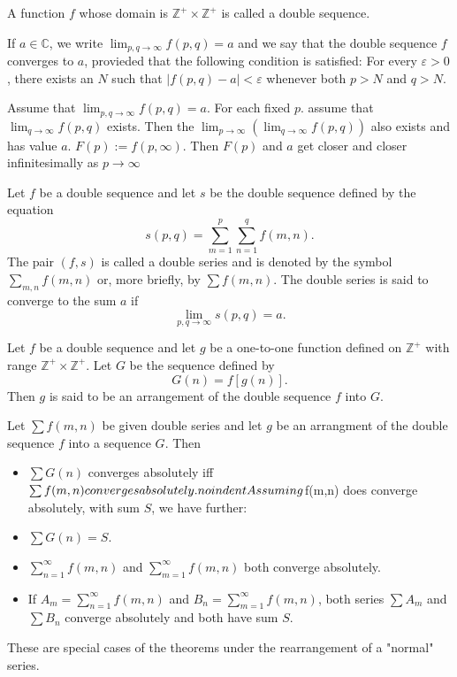 \documentclass[10pt,a4paper]{book}
\begin{document}
\begin{deff}
A function $f$ whose domain is $\mathbb{Z}^+ \times \mathbb{Z}^+$ is called a double sequence.
\end{deff}

\begin{deff}
If $a \in \mathbb{C}$, we write $\lim_{p,q \rightarrow \infty} f(p,q) = a$ and we say that the double sequence $f$ converges to $a$, provieded that the following condition is satisfied: For every $\varepsilon >0$, there exists an $N$ such that $|f(p,q)-a| < \varepsilon$ whenever both $p>N$ and $q > N$.

\end{deff}
\begin{Thm}
Assume that $\lim_{p,q \rightarrow \infty} f(p,q) = a.$ For each fixed $p$. assume that $\lim_{q \rightarrow \infty} f(p,q)$ exists. Then the $\lim_{p \rightarrow \infty}(\lim_{q \rightarrow \infty} f(p,q))$ also exists and has value $a$. $F(p) := f(p,\infty)$. Then $F(p)$ and $a$ get closer and closer infinitesimally as $p \rightarrow \infty$  
\end{Thm}

\begin{deff}
Let $f$ be a double sequence and let $s$ be the double sequence defined by the equation
$$s(p,q) = \sum_{m=1}^p \sum_{n=1}^q f(m,n).$$
The pair $(f,s)$ is called a double series and is denoted by the symbol $\sum_{m,n} f(m,n)$ or, more briefly, by $\sum f(m,n).$ The double series is said to converge to the sum $a$ if 
$$\lim_{p,q \rightarrow \infty} s(p,q) = a.$$
\end{deff}
\begin{deff}
Let $f$ be a double sequence and let $g$ be a one-to-one function defined on $\mathbb{Z}^+$ with range $\mathbb{Z}^+ \times \mathbb{Z}^+.$ Let $G$ be the sequence defined by 
$$G(n) = f[g(n)].$$
Then $g$ is said to be an arrangement of the double sequence $f$ into $G$.

\end{deff}
\begin{Thm}
Let $\sum f(m,n)$ be given double series and let $g$ be an arrangment of the double sequence $f$ into a sequence $G$. Then
\begin{itemize}
\item $\sum G(n) $ converges absolutely iff $\sum f(m,n) converges absolutely.\\
noindent Assuming $\sum f(m,n) does converge absolutely, with sum $S$, we have further:\\
\item $\sum G(n) = S$.
\item $\sum_{n=1}^\infty f(m,n)$ and $\sum_{m=1}^\infty f(m,n)$ both converge absolutely.
\item If $A_m = \sum_{n=1}^\infty f(m,n)$ and $B_n = \sum_{m=1}^\infty f(m,n)$, both series $\sum A_m$ and $\sum B_n$ converge absolutely and both have sum $S$.\end{itemize}

\end{Thm}
\PP These are special cases of the theorems under the rearrangement of a "normal" series.\\
\end{document}
